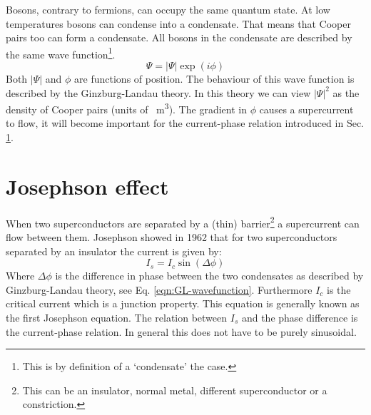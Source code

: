 Bosons, contrary to fermions, can occupy the same quantum state. At low temperatures bosons can condense into a condensate. That  means that Cooper pairs too can form a condensate. All bosons in the condensate are described by the same wave function\footnote{This is by definition of a `condensate' the case.}.
\begin{equation}
	\Psi = \left|\Psi\right| \exp(i\phi)
	\label{eqn:GL-wavefunction}
\end{equation}
Both $\left|\Psi\right|$ and $\phi$ are functions of position. The behaviour of this wave function is described by the Ginzburg-Landau theory. In this theory we can view $|\Psi|^2$ as the density of Cooper pairs (units of \unit{\per\cubic\meter}). The gradient in $\phi$ causes a supercurrent to flow, it will become important for the current-phase relation introduced in Sec. \ref{sec:josephson-effect}.

\section{Josephson effect}
\label{sec:josephson-effect}
When two superconductors are separated by a (thin) barrier\footnote{This can be an insulator, normal metal, different superconductor or a constriction.} a supercurrent can flow between them. Josephson showed in 1962 that for two superconductors separated by an insulator the current is given by\cite{tinkhamIntroductionSuperconductivity}:
\begin{equation}
	I_s = I_c \sin(\Delta \phi)
\end{equation}
Where $\Delta \phi$ is the difference in phase between the two condensates as described by Ginzburg-Landau theory, see Eq. \ref{eqn:GL-wavefunction}. Furthermore $I_c$ is the critical current which is a junction property. This equation is generally known as the first Josephson equation. The relation between $I_s$ and the phase difference is the current-phase relation. In general this does not have to be purely sinusoidal\cite{golubovCurrentphaseRelationJosephson2004a}.

